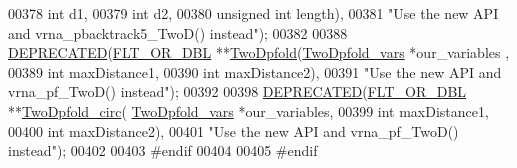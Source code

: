 \begin{DoxyCode}
00378                                  \textcolor{keywordtype}{int}            d1,
00379                                  \textcolor{keywordtype}{int}            d2,
00380                                  \textcolor{keywordtype}{unsigned} \textcolor{keywordtype}{int}   length),
00381           \textcolor{stringliteral}{"Use the new API and vrna\_pbacktrack5\_TwoD() instead"});
00382 
00388 \mbox{\hyperlink{2_dpfold_8h_aab347a3c03fbe8e7319551b9fa0cce4a}{DEPRECATED}}(\mbox{\hyperlink{group__data__structures_ga31125aeace516926bf7f251f759b6126}{FLT\_OR\_DBL}} **\mbox{\hyperlink{2_dpfold_8h_a9c71dafdc7450f4e643ef841394352fa}{TwoDpfold}}(\mbox{\hyperlink{struct_two_dpfold__vars}{TwoDpfold\_vars}}  *our\_variables
      ,
00389                                   \textcolor{keywordtype}{int}             maxDistance1,
00390                                   \textcolor{keywordtype}{int}             maxDistance2),
00391           \textcolor{stringliteral}{"Use the new API and vrna\_pf\_TwoD() instead"});
00392 
00398 \mbox{\hyperlink{2_dpfold_8h_aab347a3c03fbe8e7319551b9fa0cce4a}{DEPRECATED}}(\mbox{\hyperlink{group__data__structures_ga31125aeace516926bf7f251f759b6126}{FLT\_OR\_DBL}} **\mbox{\hyperlink{2_dpfold_8h_a97d7d52bfebbc2e71b7076ae41e63574}{TwoDpfold\_circ}}(
      \mbox{\hyperlink{struct_two_dpfold__vars}{TwoDpfold\_vars}} *our\_variables,
00399                                        \textcolor{keywordtype}{int}            maxDistance1,
00400                                        \textcolor{keywordtype}{int}            maxDistance2),
00401           \textcolor{stringliteral}{"Use the new API and vrna\_pf\_TwoD() instead"});
00402 
00403 \textcolor{preprocessor}{#endif}
00404 
00405 \textcolor{preprocessor}{#endif}
\end{DoxyCode}
